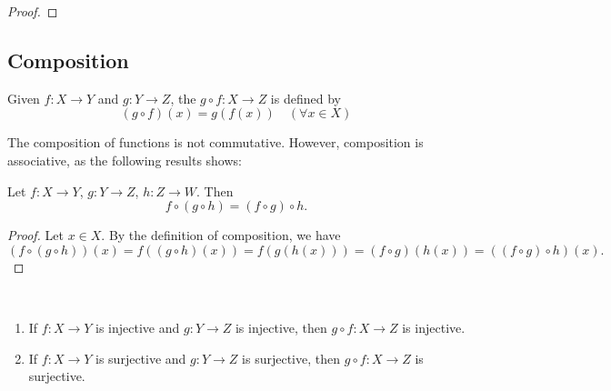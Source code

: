 \begin{proof}
\end{proof}

\subsection{Composition}
\begin{definition}[Composition]
Given $f:X\to Y$ and $g:Y\to Z$, the  $g\circ f:X\to Z$ is defined by
\[ (g \circ f)(x)=g(f(x))\quad(\forall x \in X)\]
\end{definition}

The composition of functions is not commutative. However, composition is associative, as the following results shows:

\begin{proposition}
Let $f:X\to Y$, $g:Y\to Z$, $h:Z\to W$. Then
\[f\circ (g\circ h)=(f\circ g)\circ h.\]
\end{proposition}

\begin{proof}
Let $x \in X$. By the definition of composition, we have
\[ (f \circ (g \circ h))(x) = f((g \circ h)(x)) = f(g(h(x))) = (f \circ g)(h(x)) = ((f \circ g) \circ h)(x). \]
\end{proof}

\begin{proposition} \
\begin{enumerate}[label=(\roman*)]
\item If $f:X \to Y$ is injective and $g:Y \to Z$ is injective, then $g \circ f:X \to Z$ is injective.
\item If $f:X\to Y$ is surjective and $g:Y\to Z$ is surjective, then $g \circ f:X\to Z$ is surjective.
\end{enumerate}
\end{proposition}

